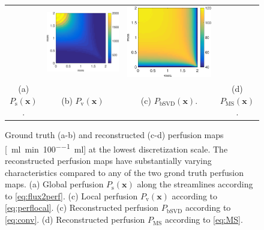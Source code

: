 \documentclass[aps,prb,article,groupedaddress,showkeys]{revtex4}
\begin{document}
\begin{figure}[h!tb]
\begin{tabular}{c c c c}
		& \includegraphics[width=\fwd]{figs/E110_CBFOnDifferentResolutions_plot-bSVD-scaleto-none-raw.eps}
		& \includegraphics[width=\fwd]{figs/E110_CBFOnDifferentResolutions_plot-MS-scaleto-none-raw.eps}\\
		(a) $P_{\mathrm{s}}(\mathbf{x})$. & (b) $P_{\mathrm{v}}(\mathbf{x})$ & (c) $P_{\mathrm{bSVD}}(\mathbf{x})$. & (d) $P_{\mathrm{MS}}(\mathbf{x})$.
	\end{tabular}
	\caption{Ground truth (a-b) and reconstructed (c-d) perfusion maps [\SI{}{\milli\litre\per\minute\per 100\milli\litre}] at the lowest discretization scale. The reconstructed perfusion maps have substantially varying characteristics compared to any of the two grond truth perfusion maps. (a) Global perfusion $P_{\mathrm{s}}(\mathbf{x})$ along the streamlines according to \eqref{eq:flux2perf}. (c) Local perfusion $P_{\mathrm{v}}(\mathbf{x})$ according to \eqref{eq:perflocal}. (c) Reconstructed perfusion $P_{\mathrm{bSVD}}$ according to \eqref{eq:conv}. (d) Reconstructed perfusion $P_{\mathrm{MS}}$ according to \eqref{eq:MS}.} 
        \label{fig:perfusionmaps}
\end{figure}	
\end{document}
